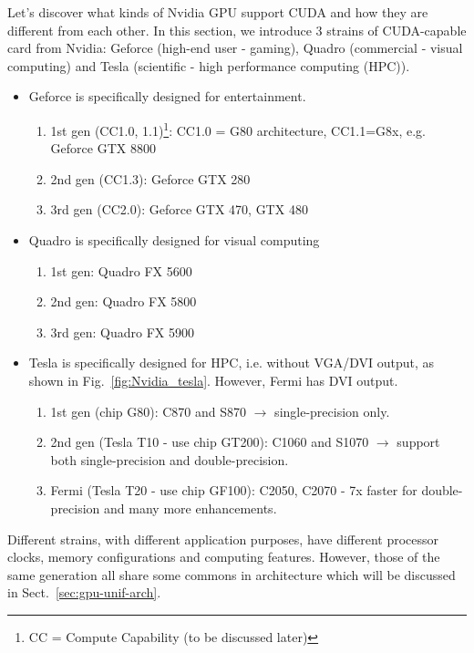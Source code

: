 Let's discover what kinds of Nvidia GPU support CUDA and how they are
different from each other. In this section, we introduce 3 strains of
CUDA-capable card from Nvidia: Geforce (high-end user - gaming),
Quadro (commercial - visual computing) and Tesla (scientific - high
performance computing (HPC)).
\begin{itemize}
\item Geforce is specifically designed for entertainment.
  \begin{enumerate}
  \item 1st gen (CC1.0, 1.1)\footnote{CC = Compute Capability (to be
      discussed later)}: CC1.0 = G80 architecture, CC1.1=G8x, e.g. Geforce GTX 
      8800 
  \item 2nd gen (CC1.3): Geforce GTX 280
  \item 3rd gen (CC2.0): Geforce GTX 470, GTX 480
  \end{enumerate}
\item Quadro is specifically designed for visual computing
  \begin{enumerate}
  \item 1st gen: Quadro FX 5600
  \item 2nd gen: Quadro FX 5800
  \item 3rd gen: Quadro FX 5900
  \end{enumerate}
\item Tesla is specifically designed for HPC, i.e. without VGA/DVI
  output, as shown in Fig.~\ref{fig:Nvidia_tesla}. However, Fermi has
  DVI output.
  \begin{enumerate}
  \item 1st gen (chip G80): C870 and S870 $\rightarrow$
    single-precision only.
  \item 2nd gen (Tesla T10 - use chip GT200): C1060 and S1070
    $\rightarrow$ support both single-precision and double-precision.
  \item Fermi (Tesla T20 - use chip GF100): C2050,
    C2070 - 7x faster for double-precision and many more enhancements.
  \end{enumerate}
\end{itemize}

Different strains, with different application purposes, have different
processor clocks, memory configurations and computing
features. However, those of the same generation all share some commons
in architecture which will be discussed in
Sect.~\ref{sec:gpu-unif-arch}.

